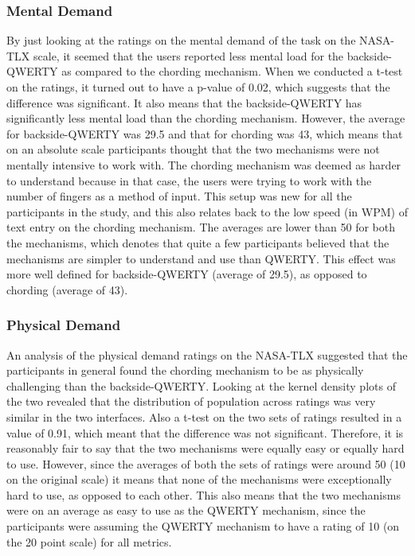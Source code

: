 \subsubsection{Mental Demand}
By just looking at the ratings on the mental demand of the task on the NASA-TLX scale, it seemed that the users reported less mental load for the backside-QWERTY as compared to the chording mechanism. When we conducted a t-test on the ratings, it turned out to have a p-value of 0.02, which suggests that the difference was significant. It also means that the backside-QWERTY has significantly less mental load than the chording mechanism. However, the average for backside-QWERTY was 29.5 and that for chording was 43, which means that on an absolute scale participants thought that the two mechanisms were not mentally intensive to work with. The chording mechanism was deemed as harder to understand because in that case, the users were trying to work with the number of fingers as a method of input. This setup was new for all the participants in the study, and this also relates back to the low speed (in WPM) of text entry on the chording mechanism. The averages are lower than 50 for both the mechanisms, which denotes that quite a few participants believed that the mechanisms are simpler to understand and use than QWERTY. This effect was more well defined for backside-QWERTY (average of 29.5), as opposed to chording (average of 43).
\subsubsection{Physical Demand}
An analysis of the physical demand ratings on the NASA-TLX suggested that the participants in general found the chording mechanism to be as physically challenging than the backside-QWERTY. Looking at the kernel density plots of the two revealed that the distribution of population across ratings was very similar in the two interfaces. Also a t-test on the two sets of ratings resulted in a value of 0.91, which meant that the difference was not significant. Therefore, it is reasonably fair to say that the two mechanisms were equally easy or equally hard to use. However, since the averages of both the sets of ratings were around 50 (10 on the original scale) it means that none of the mechanisms were exceptionally hard to use, as opposed to each other. This also means that the two mechanisms were on an average as easy to use as the QWERTY mechanism, since the participants were assuming the QWERTY mechanism to have a rating of 10 (on the 20 point scale) for all metrics. 
